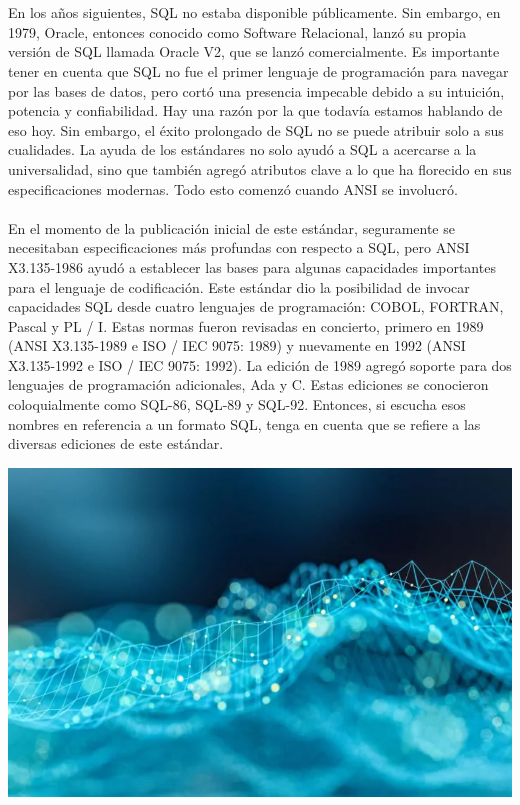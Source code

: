 \documentclass[preprint,12pt]{article}
\begin{document}
\begin{justify}
\\\\En los años siguientes, SQL no estaba disponible públicamente. Sin embargo, en 1979, Oracle, entonces conocido como Software Relacional, lanzó su propia versión de SQL llamada Oracle V2, que se lanzó comercialmente. Es importante tener en cuenta que SQL no fue el primer lenguaje de programación para navegar por las bases de datos, pero cortó una presencia impecable debido a su intuición, potencia y confiabilidad. Hay una razón por la que todavía estamos hablando de eso hoy. Sin embargo, el éxito prolongado de SQL no se puede atribuir solo a sus cualidades. La ayuda de los estándares no solo ayudó a SQL a acercarse a la universalidad, sino que también agregó atributos clave a lo que ha florecido en sus especificaciones modernas. Todo esto comenzó cuando ANSI se involucró.\\\\En el momento de la publicación inicial de este estándar, seguramente se necesitaban especificaciones más profundas con respecto a SQL, pero ANSI X3.135-1986 ayudó a establecer las bases para algunas capacidades importantes para el lenguaje de codificación. Este estándar dio la posibilidad de invocar capacidades SQL desde cuatro lenguajes de programación: COBOL, FORTRAN, Pascal y PL / I. Estas normas fueron revisadas en concierto, primero en 1989 (ANSI X3.135-1989 e ISO / IEC 9075: 1989) y nuevamente en 1992 (ANSI X3.135-1992 e ISO / IEC 9075: 1992). La edición de 1989 agregó soporte para dos lenguajes de programación adicionales, Ada y C. Estas ediciones se conocieron coloquialmente como SQL-86, SQL-89 y SQL-92. Entonces, si escucha esos nombres en referencia a un formato SQL, tenga en cuenta que se refiere a las diversas ediciones de este estándar.

			\begin{center}
					\includegraphics[width=15cm]{./img/1}
				\end{center}	


\end{justify}
\end{document}
